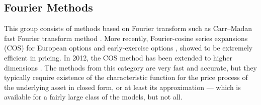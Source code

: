 \documentclass{UUThesisTemplate}
\begin{document}
\subsection{Fourier Methods}
\par This group consists of methods based on Fourier transform such as Carr--Madan fast Fourier transform method \cite{carr1999option}. More recently, Fourier-cosine series expansions (COS) for European options \cite{fang2008novel} and early-exercise options \cite{fang2009pricing}, showed to be extremely efficient in pricing. In 2012, the COS method has been extended to higher dimensions \cite{ruijter2012two}. The methods from this category are very fast and accurate, but they typically require existence of the characteristic function for the price process of the underlying asset in closed form, or at least its approximation --- which is available for a fairly large class of the models, but not all. 
%
\end{document}
